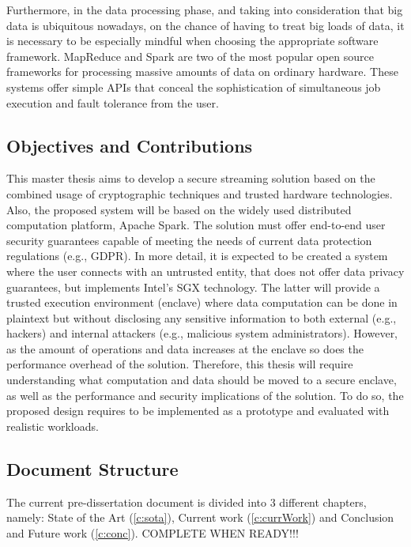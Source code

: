 Furthermore, in the data processing phase, and taking into consideration that big data is ubiquitous nowadays, on the chance of having to treat big loads of data, it is necessary to be especially mindful when choosing the appropriate software framework. MapReduce and Spark are two of the most popular open source frameworks for processing massive amounts of data on ordinary hardware. These systems offer simple APIs that conceal the sophistication of simultaneous job execution and fault tolerance from the user. \cite{mapreducevsspark}


\subsection{Objectives and Contributions}
This master thesis aims to develop a secure streaming solution based on the combined usage of cryptographic techniques and trusted hardware technologies. Also, the proposed system will be based on the widely used distributed computation platform, Apache Spark. The solution must offer end-to-end user security guarantees capable of meeting the needs of current data protection regulations (e.g., GDPR). In more detail, it is expected to be created a system where the user connects with an untrusted entity, that does not offer data privacy guarantees, but implements Intel’s SGX technology. The latter will provide a trusted execution environment (enclave) where data computation can be done in plaintext but without disclosing any sensitive information to both external (e.g., hackers) and internal attackers (e.g., malicious system administrators). However, as the amount of operations and data increases at the enclave so does the performance overhead of the solution. Therefore, this thesis will require understanding what computation and data should be moved to a secure enclave, as well as the performance and security implications of the solution. To do so, the proposed design requires to be implemented as a prototype and evaluated with realistic workloads. 

\subsection{Document Structure}
The current pre-dissertation document is divided into 3 different chapters, namely: State of the Art (\ref{c:sota}), Current work (\ref{c:currWork}) and Conclusion and Future work (\ref{c:conc}). COMPLETE WHEN READY!!!